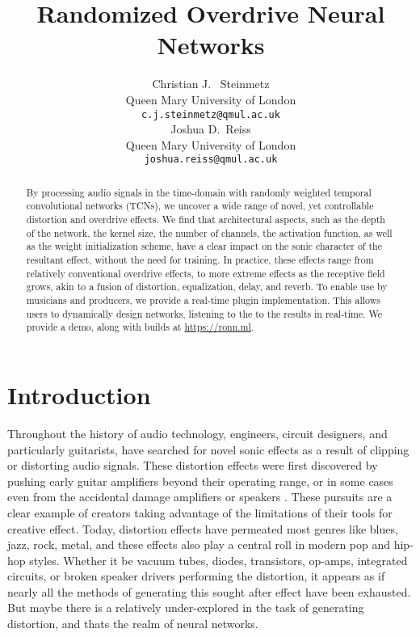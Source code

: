 \documentclass{article}
\title{Randomized Overdrive Neural Networks}
\author{%
  Christian J. ~Steinmetz \\
  Queen Mary University of London\\
  \texttt{c.j.steinmetz@qmul.ac.uk} \\
  \And
  Joshua D.~Reiss \\
  Queen Mary University of London \\
  \texttt{joshua.reiss@qmul.ac.uk} \\
}
\begin{document}
\maketitle

\begin{abstract}

By processing audio signals in the time-domain with randomly weighted temporal convolutional networks (TCNs),
we uncover a wide range of novel, yet controllable distortion and overdrive effects. 
We find that architectural aspects, such as the depth of the network, 
the kernel size, the number of channels, the activation function, as well as the weight initialization scheme, 
have a clear impact on the sonic character of the resultant effect, without the need for training. 
In practice, these effects range from relatively conventional overdrive effects,
to more extreme effects as the receptive field grows, akin to a fusion of distortion, equalization, delay, and reverb.  
To enable use by musicians and producers, we provide a real-time plugin implementation.
This allows users to dynamically design networks, listening to the to the results in real-time.
We provide a demo, along with builds at \url{https://ronn.ml}.

\end{abstract} 


\section{Introduction}

Throughout the history of audio technology, engineers, circuit designers, 
and particularly guitarists, have searched for novel sonic effects as a result of clipping or distorting audio signals. 
These distortion effects were first discovered by pushing early guitar amplifiers beyond their operating range, 
or in some cases even from the accidental damage amplifiers or speakers \cite{shepherd2003distortion}. 
These pursuits are a clear example of creators taking advantage of the limitations of their tools for creative effect.
Today, distortion effects have permeated most genres like blues, jazz, rock, metal, 
and these effects also play a central roll in modern pop and hip-hop styles.
Whether it be vacuum tubes, diodes, transistors, op-amps, integrated circuits, or broken speaker drivers performing the distortion, 
it appears as if nearly all the methods of generating this sought after effect have been exhausted. 
But maybe there is a relatively under-explored in the task of generating distortion, and thats the realm of neural networks.
\end{document}
